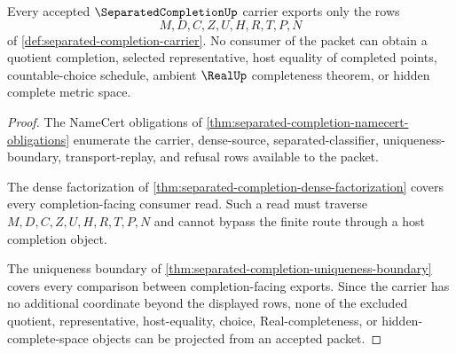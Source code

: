 \begin{theorem}
\label{thm:separated-completion-nonescape}
Every accepted $\SeparatedCompletionUp$ carrier exports only the rows
$$
M,D,C,Z,U,H,R,T,P,N
$$
of \autoref{def:separated-completion-carrier}. No consumer of the packet can obtain a quotient completion, selected representative, host equality of completed points, countable-choice schedule, ambient $\RealUp$ completeness theorem, or hidden complete metric space.
\end{theorem}
\begin{proof}
The NameCert obligations of \autoref{thm:separated-completion-namecert-obligations} enumerate the carrier, dense-source, separated-classifier, uniqueness-boundary, transport-replay, and refusal rows available to the packet.

The dense factorization of \autoref{thm:separated-completion-dense-factorization} covers every completion-facing consumer read. Such a read must traverse $M,D,C,Z,U,H,R,T,P,N$ and cannot bypass the finite route through a host completion object.

The uniqueness boundary of \autoref{thm:separated-completion-uniqueness-boundary} covers every comparison between completion-facing exports. Since the carrier has no additional coordinate beyond the displayed rows, none of the excluded quotient, representative, host-equality, choice, Real-completeness, or hidden-complete-space objects can be projected from an accepted packet.
\end{proof}

